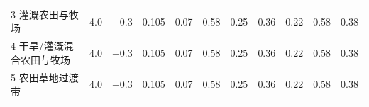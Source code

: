 \begin{landscape}
\begin{table}[htbp]
\begin{tabular}{@{}lcccccccccc@{}}
    3 灌溉农田与牧场      & 4.0        & \num{ -0.3  }                                                                       & 0.105                                                                                                           & 0.07                                                                                                            & 0.58                                                                                                            & 0.25                                                                                                            & 0.36                                                                                                            & 0.22                                                                                                            & 0.58                                                                                                            & 0.38                                                                                                            \\
    4 干旱/灌溉混合农田与牧场 & 4.0        & \num{ -0.3  }                                                                       & 0.105                                                                                                           & 0.07                                                                                                            & 0.58                                                                                                            & 0.25                                                                                                            & 0.36                                                                                                            & 0.22                                                                                                            & 0.58                                                                                                            & 0.38                                                                                                            \\
    5 农田草地过渡带      & 4.0        & \num{ -0.3  }                                                                       & 0.105                                                                                                           & 0.07                                                                                                            & 0.58                                                                                                            & 0.25                                                                                                            & 0.36                                                                                                            & 0.22                                                                                                            & 0.58                                                                                                            & 0.38                                                                                                            \\

\end{tabular}
\end{table}
\end{landscape}
